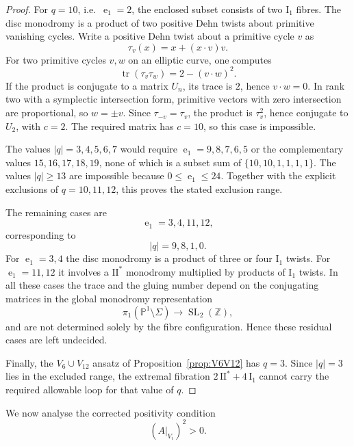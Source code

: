 \documentclass[12pt]{article}
\theoremstyle{plain}
\theoremstyle{definition}
\DeclareMathOperator{\tr}{tr}
\DeclareMathOperator{\SL}{SL}
\DeclareMathOperator{\eul}{e}
\newcommand{\bZ}{\mathbb{Z}}
\newcommand{\bP}{\mathbb{P}}
\begin{document}
\begin{proof}
For $q=10$, i.e.\ $\eul_1=2$, the enclosed subset consists of two $\mathrm{I}_1$ fibres.  The disc monodromy is a product of two positive Dehn twists about primitive vanishing cycles.  Write a positive Dehn twist about a primitive cycle $v$ as
\[
\tau_v(x)=x+(x\cdot v)v.
\]
For two primitive cycles $v,w$ on an elliptic curve, one computes
\[
\tr(\tau_v\tau_w)=2-(v\cdot w)^2.
\]
If the product is conjugate to a matrix $U_n$, its trace is $2$, hence $v\cdot w=0$.  In rank two with a symplectic intersection form, primitive vectors with zero intersection are proportional, so $w=\pm v$.  Since $\tau_{-v}=\tau_v$, the product is $\tau_v^2$, hence conjugate to $U_2$, with $c=2$.  The required matrix has $c=10$, so this case is impossible.

The values $|q|=3,4,5,6,7$ would require $\eul_1=9,8,7,6,5$ or the complementary values $15,16,17,18,19$, none of which is a subset sum of $\{10,10,1,1,1,1\}$.  The values $|q|\ge 13$ are impossible because $0\le \eul_1\le 24$.  Together with the explicit exclusions of $q=10,11,12$, this proves the stated exclusion range.

The remaining cases are
\[
\eul_1=3,4,11,12,
\]
corresponding to
\[
|q|=9,8,1,0.
\]
For $\eul_1=3,4$ the disc monodromy is a product of three or four $\mathrm{I}_1$ twists.  For $\eul_1=11,12$ it involves a $\mathrm{II}^*$ monodromy multiplied by products of $\mathrm{I}_1$ twists.  In all these cases the trace and the gluing number depend on the conjugating matrices in the global monodromy representation
\[
\pi_1(\bP^1\setminus \Sigma)\to \SL_2(\bZ),
\]
and are not determined solely by the fibre configuration.  Hence these residual cases are left undecided.

Finally, the $V_6\cup V_{12}$ ansatz of Proposition~\ref{prop:V6V12} has $q=3$.  Since $|q|=3$ lies in the excluded range, the extremal fibration $2\,\mathrm{II}^*+4\,\mathrm{I}_1$ cannot carry the required allowable loop for that value of $q$.
\end{proof}

We now analyse the corrected positivity condition
\[
(A|_{V_i})^2>0.
\]
\end{document}
